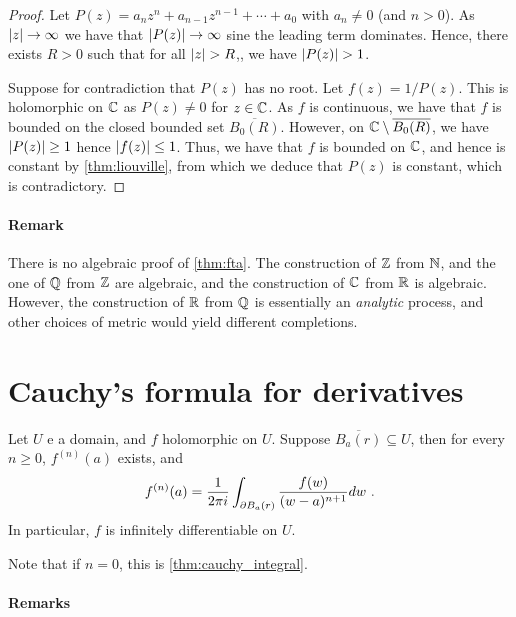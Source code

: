 \begin{proof}
  Let $P(z) = a_nz^n + a_{n-1}z^{n-1} + \dotsb + a_0$ with $a_n \neq 0$ (and $n > 0$).
As $\lvert z\rvert \rightarrow \infty$ we have that $\lvert P(z)\rvert \rightarrow \infty$ sine the leading term dominates.
Hence, there exists $R > 0$ such that for all $\lvert z\rvert > R$,, we have $\lvert P(z)\rvert > 1$.

Suppose for contradiction that $P(z)$ has no root.
Let $f(z) = 1/P(z)$. This is holomorphic on $\mathbb{C}$ as $P(z) \neq 0$ for $z \in \mathbb{C}$.
As $f$ is continuous, we have that $f$ is bounded on the closed bounded set $\overline{B_0(R)}$.
However, on $\mathbb{C} \setminus \overline{B_0(R)}$, we have $\lvert P(z)\rvert \geq 1$ hence $\lvert f(z)\rvert \leq 1$.
Thus, we have that $f$ is bounded on $\mathbb{C}$, and hence is constant by \cref{thm:liouville}, from which we deduce that $P(z)$ is constant, which is contradictory.
\end{proof}

\paragraph{Remark}

There is no algebraic proof of \cref{thm:fta}.
The construction of $\mathbb{Z}$ from $\mathbb{N}$, and the one of $\mathbb{Q}$ from $\mathbb{Z}$ are algebraic, and the construction of $\mathbb{C}$ from $\mathbb{R}$ is algebraic.
However, the construction of $\mathbb{R}$ from $\mathbb{Q}$ is essentially an \emph{analytic} process, and other choices of metric would yield different completions.

\section{Cauchy's formula for derivatives}

\begin{theorem}
Let $U$ e a domain, and $f$ holomorphic on $U$.
Suppose $\overline{B_a(r)} \subseteq U$, then for every $n \geq 0$, $f^{(n)}(a)$ exists, and
\[
f^{(n)}(a) = \frac{1}{2 \pi i} \int_{\partial B_a(r)} \frac{f(w)}{(w-a)^{n+1}} dw \ \text{.}
\]
In particular, $f$ is infinitely differentiable on $U$.
\end{theorem}

Note that if $n = 0$, this is \cref{thm:cauchy_integral}.

\paragraph{Remarks}

